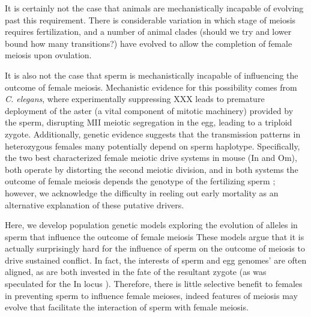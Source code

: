 \documentclass[12pt,letterpaper]{article}
\newcommand{\yb}[1]{{ \color{blue} #1}}
\begin{document}
It is certainly not the case that animals are mechanistically incapable of evolving past this requirement.
There is considerable variation in which stage of meiosis requires fertilization, and 
a number of animal clades (should we try and lower bound how many transitions?) have evolved
to allow the completion of female meiosis upon ovulation. 

It is also not the case that sperm is mechanistically incapable of influencing the outcome of female meiosis.
Mechanistic evidence for this possibility comes from
\emph{C. elegans}, where experimentally suppressing XXX leads to
premature deployment of the aster (a vital component of mitotic
machinery) provided by the sperm, disrupting MII meiotic segregation in the egg, leading to a triploid zygote. 
Additionally, genetic evidence suggests that the transmission patterns
in heterozygous females many potentially depend on sperm haplotype. 
Specifically, the two best characterized female meiotic drive systems in mouse (In and Om), both operate by distorting the second meiotic division, 
and in both systems the outcome of female meiosis depends the genotype of the fertilizing sperm \citep{Agulnik1993,Wu2005}; 
	\yb{however,  we acknowledge the difficulty in reeling out early mortality as an alternative explanation of these putative drivers}.


Here, we develop population genetic models exploring the evolution of alleles in sperm that influence the outcome of female meiosis 
These models argue that it is actually surprisingly hard for the influence of sperm on the outcome of meiosis to drive sustained conflict. 
In fact, the interests of sperm and egg  genomes' are often aligned, as are both invested in the fate of the resultant zygote 
	(as was speculated for the In locus \citep{Pomiankowski1993}).
Therefore, there is little selective benefit to females in preventing sperm to influence female meioses,
	indeed features of meiosis may evolve that facilitate the interaction of sperm with female meiosis. 
\end{document}
